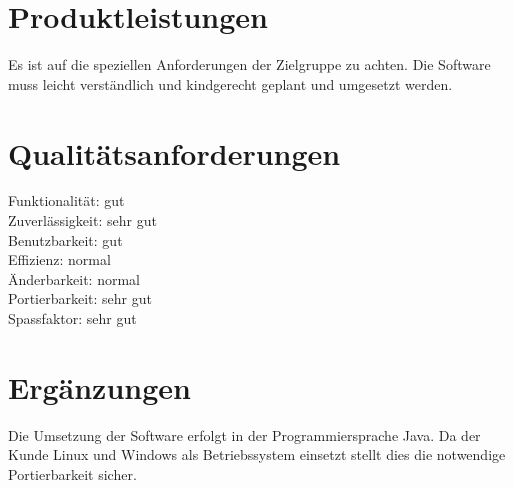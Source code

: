 \section{Produktleistungen} %
Es ist auf die speziellen Anforderungen der Zielgruppe zu achten. Die Software muss leicht verständlich und kindgerecht geplant und umgesetzt werden.

\section{Qualitätsanforderungen} %
Funktionalität:	\hspace{15 mm}		gut\\
Zuverlässigkeit:\hspace{15 mm}		sehr gut\\
Benutzbarkeit:	\hspace{15 mm}		gut\\
Effizienz:	\hspace{24 mm}		normal\\
Änderbarkeit:	\hspace{16 mm}		normal\\
Portierbarkeit:	\hspace{15 mm}		sehr gut\\
Spassfaktor:	\hspace{19 mm}		sehr gut\\
\section{Ergänzungen} %
Die Umsetzung der Software erfolgt in der Programmiersprache Java. Da der Kunde Linux und Windows als Betriebssystem einsetzt stellt dies die notwendige Portierbarkeit sicher.


